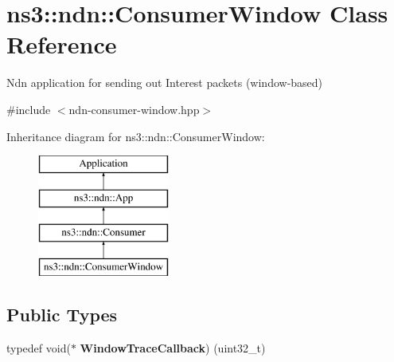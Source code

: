 \hypertarget{classns3_1_1ndn_1_1ConsumerWindow}{}\section{ns3\+:\+:ndn\+:\+:Consumer\+Window Class Reference}
\label{classns3_1_1ndn_1_1ConsumerWindow}


Ndn application for sending out Interest packets (window-\/based)  




{\ttfamily \#include $<$ndn-\/consumer-\/window.\+hpp$>$}

Inheritance diagram for ns3\+:\+:ndn\+:\+:Consumer\+Window\+:\begin{figure}[H]
\begin{center}
\leavevmode
\includegraphics[height=4.000000cm]{classns3_1_1ndn_1_1ConsumerWindow}
\end{center}
\end{figure}
\subsection*{Public Types}
\begin{DoxyCompactItemize}
\item 
typedef void($\ast$ {\bfseries Window\+Trace\+Callback}) (uint32\+\_\+t)\hypertarget{classns3_1_1ndn_1_1ConsumerWindow_a679a990b4bdc077b7051d76c0e7f8d76}{}\label{classns3_1_1ndn_1_1ConsumerWindow_a679a990b4bdc077b7051d76c0e7f8d76}

\end{DoxyCompactItemize}
